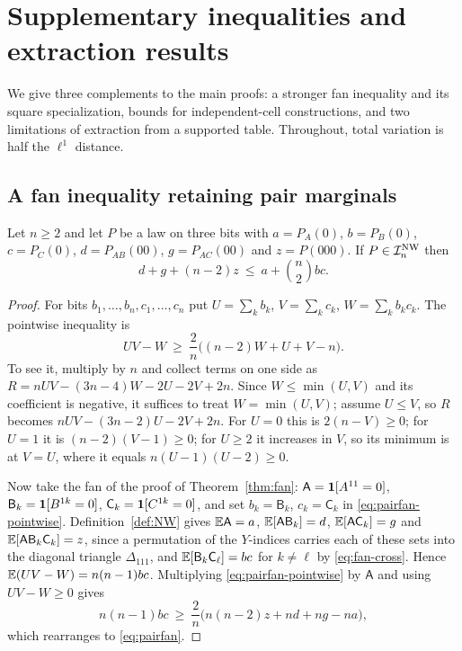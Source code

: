 \providecommand{\Csq}{\mathcal C_{\square}}
\providecommand{\Cpar}{\mathcal C_{\mathrm{par}}}
\providecommand{\Par}[3]{\Pi(#1,#2,#3)}
\section{Supplementary inequalities and extraction results}\label{app:supporting}

We give three complements to the main proofs: a stronger fan inequality and its square specialization, bounds for independent-cell constructions, and two limitations of extraction from a supported table. Throughout, total variation is half the $\ell^1$ distance.

\subsection{A fan inequality retaining pair marginals}

\begin{proposition}\label{prop:pairfan}
Let $n\ge2$ and let $P$ be a law on three bits with $a=P_A(0)$, $b=P_B(0)$, $c=P_C(0)$, $d=P_{AB}(00)$, $g=P_{AC}(00)$ and $z=P(000)$. If $P\in\mathcal I^{\mathrm{NW}}_n$ then
\begin{equation}\label{eq:pairfan}
d+g+(n-2)z\ \le\ a+\binom n2bc .
\end{equation}
\end{proposition}

\begin{proof}
For bits $b_1,\dots,b_n,c_1,\dots,c_n$ put $U=\sum_kb_k$, $V=\sum_kc_k$, $W=\sum_kb_kc_k$. The pointwise inequality is
\begin{equation}\label{eq:pairfan-pointwise}
UV-W\ \ge\ \frac2n\bigl((n-2)W+U+V-n\bigr).
\end{equation}
To see it, multiply by $n$ and collect terms on one side as $R=nUV-(3n-4)W-2U-2V+2n$. Since $W\le\min(U,V)$ and its coefficient is negative, it suffices to treat $W=\min(U,V)$; assume $U\le V$, so $R$ becomes $nUV-(3n-2)U-2V+2n$. For $U=0$ this is $2(n-V)\ge0$; for $U=1$ it is $(n-2)(V-1)\ge0$; for $U\ge2$ it increases in $V$, so its minimum is at $V=U$, where it equals $n(U-1)(U-2)\ge0$.

Now take the fan of the proof of Theorem~\ref{thm:fan}: $\mathsf A=\mathbf 1[A^{11}=0]$, $\mathsf B_k=\mathbf 1[B^{1k}=0]$, $\mathsf C_k=\mathbf 1[C^{1k}=0]$, and set $b_k=\mathsf B_k$, $c_k=\mathsf C_k$ in \eqref{eq:pairfan-pointwise}. Definition~\ref{def:NW} gives $\mathbb E\mathsf A=a$, $\mathbb E[\mathsf A\mathsf B_k]=d$, $\mathbb E[\mathsf A\mathsf C_k]=g$ and $\mathbb E[\mathsf A\mathsf B_k\mathsf C_k]=z$, since a permutation of the $Y$-indices carries each of these sets into the diagonal triangle $\Delta_{111}$, and $\mathbb E[\mathsf B_k\mathsf C_\ell]=bc$ for $k\ne\ell$ by \eqref{eq:fan-cross}. Hence $\mathbb E(UV-W)=n(n-1)bc$. Multiplying \eqref{eq:pairfan-pointwise} by $\mathsf A$ and using $UV-W\ge0$ gives
\[
n(n-1)bc\ \ge\ \frac2n\bigl(n(n-2)z+nd+ng-na\bigr),
\]
which rearranges to \eqref{eq:pairfan}.
\end{proof}


